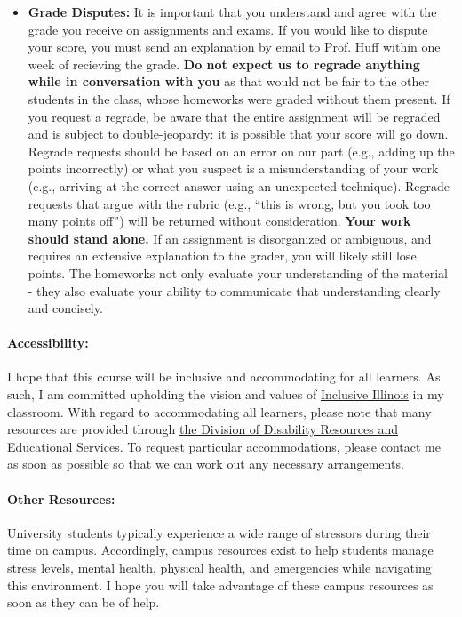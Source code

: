 \documentclass[11pt, a4paper]{article}
\begin{document}
\begin{itemize}
\item[] \textbf{Grade Disputes:} It is important that you understand and agree 
        with the grade you receive on assignments and exams. If you would like 
        to dispute your score, you must send an explanation by email to Prof. 
        Huff within one week of recieving the grade.  
        \textbf{Do not expect us to regrade anything while in conversation with 
        you} as that would not be fair to the other students in the class, whose 
        homeworks were graded without them present.  If you request a regrade, 
        be aware that the entire assignment will be regraded and is subject to 
        double-jeopardy: it is possible that your score will go down.
        Regrade requests should be based on an error on our part (e.g., adding 
        up the points incorrectly) or what you suspect is a misunderstanding of 
        your work (e.g., arriving at the correct answer using an unexpected 
        technique). Regrade requests that argue with the rubric (e.g., ``this is 
        wrong, but you took too many points off'') will be returned without 
        consideration. 
        \textbf{Your work should stand alone.} If an assignment is disorganized or 
        ambiguous, and requires an extensive explanation to the grader, you 
        will likely still lose points. The homeworks not only evaluate your 
        understanding of the material - they also evaluate your ability to 
        communicate that understanding clearly and concisely.
\end{itemize}

\paragraph{Accessibility:} I hope that this course will be inclusive and 
accommodating for all learners. As such, I am committed upholding the vision 
and values of \href{http://www.inclusiveillinois.illinois.edu/index.html}{Inclusive Illinois}
in my 
classroom.  With regard to accommodating all learners, please note that many 
resources are provided through 
\href{http://disability.illinois.edu/academic-support/accommodations}{the 
Division of Disability Resources and Educational Services}.  To request 
particular accommodations, please contact me as soon as possible so that we can 
work out any necessary arrangements.

\paragraph{Other Resources:} 
University students typically experience a wide range of stressors during their 
time on campus. Accordingly, campus resources exist to help students manage  
stress levels, mental health, physical health, and emergencies while navigating 
this environment. I hope you will take advantage of these campus resources as 
soon as they can be of help.
\end{document}
